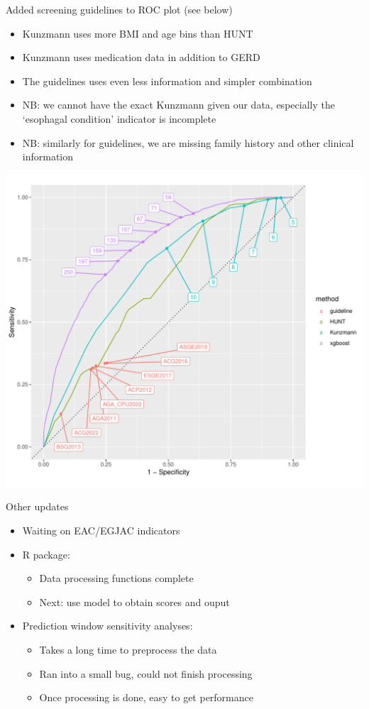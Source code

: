 \documentclass[12pt]{article}
\begin{document}
Added screening guidelines to ROC plot (see below)
\begin{itemize}
		\item Kunzmann uses more BMI and age bins than HUNT
		\item Kunzmann uses medication data in addition to GERD
		\item The guidelines uses even less information and simpler combination 
		\item NB: we cannot have the exact Kunzmann given our data, especially the `esophagal condition' indicator is incomplete
		\item NB: similarly for guidelines, we are missing family history and other clinical information
\end{itemize}

\begin{center}
\includegraphics[width=\textwidth]{xgb_kunzmann_hunt_roc.pdf}
\end{center}

\clearpage

Other updates
\begin{itemize}
	\item Waiting on EAC/EGJAC indicators
	\item R package:
	\begin{itemize}
		\item Data processing functions complete
		\item Next: use model to obtain scores and ouput
	\end{itemize}
	\item Prediction window sensitivity analyses:
	\begin{itemize}
		\item Takes a long time to preprocess the data
		\item Ran into a small bug, could not finish processing
		\item Once processing is done, easy to get performance
	\end{itemize}
\end{itemize}
\end{document}
